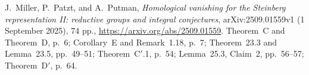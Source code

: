 J.~Miller, P.~Patzt, and A.~Putman,
\emph{Homological vanishing for the Steinberg representation II:
reductive groups and integral conjectures},
arXiv:2509.01559v1 (1 September 2025), 74 pp.,
\url{https://arxiv.org/abs/2509.01559}.
Theorem~C and Theorem~D, p.~6; Corollary~E and Remark~1.18,
p.~7; Theorem~23.3 and Lemma~23.5, pp.~49--51;
Theorem~C$'$.1, p.~54; Lemma~25.3, Claim~2, pp.~56--57;
Theorem~D$'$, p.~64.
